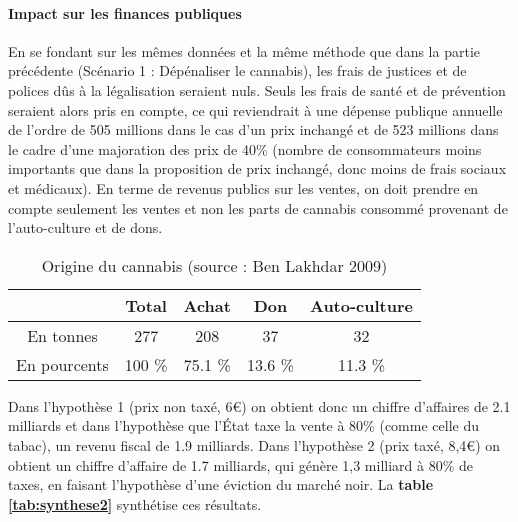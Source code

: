\paragraph{Impact sur les finances publiques} En se fondant sur les mêmes données et la même méthode que dans la partie précédente (Scénario 1 : Dépénaliser le cannabis), les frais de justices et de polices dûs à la légalisation seraient nuls. Seuls les frais de santé et de prévention seraient alors pris en compte, ce qui reviendrait à une dépense publique annuelle de l’ordre de 505 millions dans le cas d’un prix inchangé et de 523 millions dans le cadre d’une majoration des prix de 40\% (nombre de consommateurs moins importants que dans la proposition de prix inchangé, donc moins de frais sociaux et médicaux).
En terme de revenus publics sur les ventes, on doit prendre en compte seulement les ventes et non les parts de cannabis consommé provenant de l’auto-culture et de dons.\cite{durand_cannabis_2016}

\renewcommand{\arraystretch}{1.2}
\begin{table}\centering
\begin{tabular}{c|cccc}
&Total&Achat&Don&Auto-culture \\ \hline
En tonnes&277&208&37&32\\
En pourcents&100 \%&75.1 \% & 13.6 \% & 11.3 \% \\
\end{tabular}
\caption{Origine du cannabis (source : Ben Lakhdar 2009)}
\end{table}

 
Dans l’hypothèse 1 (prix non taxé, 6\euro) on obtient donc un chiffre d’affaires de 2.1 milliards et dans l’hypothèse que l'État taxe la vente à 80\% (comme celle du tabac), un revenu fiscal de 1.9 milliards.
Dans l’hypothèse 2 (prix taxé, 8,4\euro) on obtient un chiffre d’affaire de 1.7 milliards, qui génère 1,3 milliard à 80\% de taxes, en faisant l’hypothèse d’une éviction du marché noir. La \textbf{table \ref{tab:synthese2}} synthétise ces résultats.


